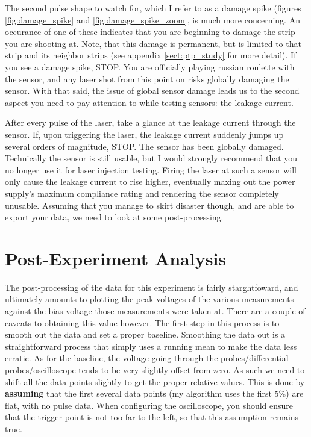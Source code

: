 \documentclass{report}
\begin{document}
            The second pulse shape to watch for, which I refer to as a damage spike (figures \ref{fig:damage_spike} and \ref{fig:damage_spike_zoom}, is much more concerning. An occurance of one of these indicates that you are beginning to damage the strip you are shooting at. Note, that this damage is permanent, but is limited to that strip and its neighbor strips (see appendix \ref{sect:ptp_study} for more detail). If you see a damage spike, STOP. You are officially playing russian roulette with the sensor, and any laser shot from this point on risks globally damaging the sensor. With that said, the issue of global sensor damage leads us to the second aspect you need to pay attention to while testing sensors: the leakage current.

            After every pulse of the laser, take a glance at the leakage current through the sensor. If, upon triggering the laser, the leakage current suddenly jumps up several orders of magnitude, STOP. The sensor has been globally damaged. Technically the sensor is still usable, but I would strongly recommend that you no longer use it for laser injection testing. Firing the laser at such a sensor will only cause the leakage current to rise higher, eventually maxing out the power supply's maximum compliance rating and rendering the sensor completely unusable. Assuming that you manage to skirt disaster though, and are able to export your data, we need to look at some post-processing.

        \section{ Post-Experiment Analysis }
            The post-processing of the data for this experiment is fairly starghtfoward, and ultimately amounts to plotting the peak voltages of the various measurements against the bias voltage those measurements were taken at. There are a couple of caveats to obtaining this value however. The first step in this process is to smooth out the data and set a proper baseline. Smoothing the data out is a straightforward process that simply uses a running mean to make the data less erratic. As for the baseline, the voltage going through the probes/differential probes/oscilloscope tends to be very slightly offset from zero. As such we need to shift all the data points slightly to get the proper relative values. This is done by \textbf{assuming} that the first several data points (my algorithm uses the first 5\%) are flat, with no pulse data. When configuring the oscilloscope, you should ensure that the trigger point is not too far to the left, so that this assumption remains true.
\end{document}
